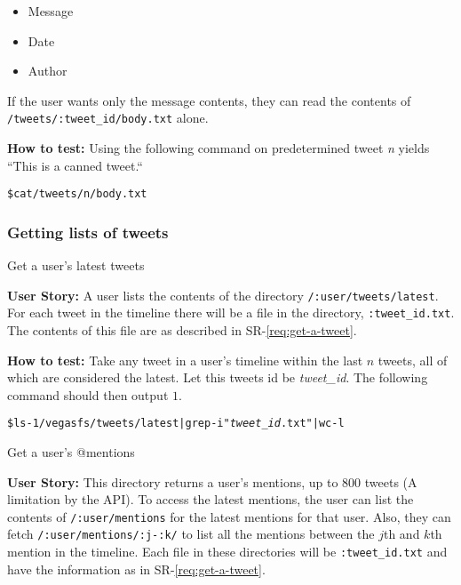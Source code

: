 \begin{Requirements}
\begin{itemize}
\item Message
\item Date
\item Author
\end{itemize}

If the user wants only the message contents, they can read the contents of
\texttt{/tweets/:tweet\_id/body.txt} alone.

\textbf{How to test:} Using the following command on predetermined tweet
\textit{n} yields ``This is a canned tweet.``

\begin{alltt}
    \$ cat /tweets/n/body.txt
\end{alltt}

\subsubsection{Getting lists of tweets}
\item Get a user's latest tweets\label{req:get-latest}

\textbf{User Story:} A user lists the contents of the directory
\texttt{/:user/tweets/latest}. For each tweet in the timeline there will be a
file in the directory, \texttt{:tweet\_id.txt}. The contents of this file are as
described in SR-\ref{req:get-a-tweet}.

\textbf{How to test:} Take any tweet in a user's timeline within the last $n$
tweets, all of which are considered the latest. Let this tweets id be
\textit{tweet\_id}. The following command should then output $1$.

\begin{alltt}
    \$ ls -1 /vegasfs/tweets/latest | grep -i "\textit{tweet\_id}.txt" | wc -l
\end{alltt}

\item Get a user's @mentions

\textbf{User Story:} This directory returns a user's mentions, up to 800 tweets (A
limitation by the API). To access the latest mentions, the user can list the
contents of \texttt{/:user/mentions} for the latest mentions for that user.
Also, they can fetch \texttt{/:user/mentions/:j-:k/} to list all the mentions
between the $j$th and $k$th mention in the timeline. Each file in these
directories will be \texttt{:tweet\_id.txt} and have the information as in
SR-\ref{req:get-a-tweet}.


\end{Requirements}
